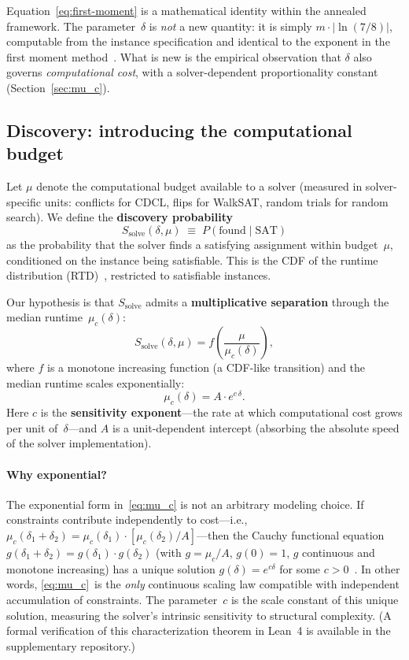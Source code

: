 \documentclass[11pt,a4paper]{article}
\newcommand{\mc}{\mu_c}
\newcommand{\Ssolve}{S_{\text{solve}}}
\newcommand{\PfSAT}{P(\text{found}\mid\text{SAT})}
\begin{document}
Equation~\eqref{eq:first-moment} is a mathematical identity
within the annealed framework.
The parameter~$\delta$ is \emph{not} a new quantity:
it is simply $m \cdot |\!\ln(7/8)|$, computable from the instance
specification and identical to the exponent in the first moment
method~\cite{MPZ2009}.
What is new is the empirical observation that $\delta$ also
governs \emph{computational cost}, with a solver-dependent
proportionality constant (Section~\ref{sec:mu_c}).

\subsection{Discovery: introducing the computational budget}

Let $\mu$ denote the computational budget available to a solver
(measured in solver-specific units: conflicts for CDCL, flips for
WalkSAT, random trials for random search).
We define the \textbf{discovery probability}
\begin{equation}
\label{eq:ssolve}
\Ssolve(\delta, \mu) \;\equiv\; \PfSAT
\end{equation}
as the probability that the solver finds a satisfying assignment
within budget~$\mu$, conditioned on the instance being satisfiable.
This is the CDF of the runtime distribution
(RTD)~\cite{Hoos1999,Frost1997}, restricted to satisfiable instances.

Our hypothesis is that $\Ssolve$ admits a
\textbf{multiplicative separation} through the median
runtime~$\mc(\delta)$:
\begin{equation}
\label{eq:separation}
\Ssolve(\delta, \mu) = f\!\left(\frac{\mu}{\mc(\delta)}\right),
\end{equation}
where $f$ is a monotone increasing function (a CDF-like transition)
and the median runtime scales exponentially:
\begin{equation}
\label{eq:mu_c}
\mc(\delta) = A \cdot e^{c\,\delta}.
\end{equation}
Here $c$ is the \textbf{sensitivity exponent}---the rate at which
computational cost grows per unit of~$\delta$---and $A$
is a unit-dependent intercept (absorbing the absolute speed of
the solver implementation).

\paragraph{Why exponential?}
The exponential form in~\eqref{eq:mu_c} is not an arbitrary
modeling choice.
If constraints contribute independently to cost---i.e.,
$\mc(\delta_1 + \delta_2) = \mc(\delta_1) \cdot
[\mc(\delta_2)/A]$---then the Cauchy functional equation
$g(\delta_1 + \delta_2) = g(\delta_1) \cdot g(\delta_2)$
(with $g = \mc/A$, $g(0) = 1$, $g$ continuous and monotone
increasing)
has a unique solution $g(\delta) = e^{c\delta}$ for some
$c > 0$~\cite{Aczel1966}.
In other words, \eqref{eq:mu_c}~is the \emph{only} continuous
scaling law compatible with independent accumulation of
constraints.
The parameter~$c$ is the scale constant of this unique solution,
measuring the solver's intrinsic sensitivity to structural
complexity.
(A formal verification of this characterization theorem in
Lean~4 is available in the supplementary repository.)
\end{document}
